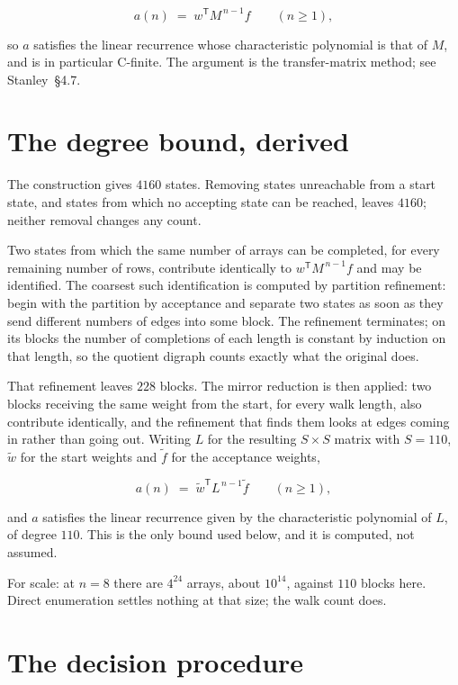 \documentclass[11pt]{article}
\theoremstyle{definition}
\begin{document}
\[a(n) \;=\; w^{\mathsf T} M^{\,n-1} f \qquad (n \ge 1),\]

so $a$ satisfies the linear recurrence whose characteristic polynomial is that of $M$, and is in particular C-finite. The argument is the transfer-matrix method; see Stanley~\S4.7.

\section{The degree bound, derived}

The construction gives $4160$ states. Removing states unreachable from a start state, and states from which no accepting state can be reached, leaves $4160$; neither removal changes any count.

Two states from which the same number of arrays can be completed, for every remaining number of rows, contribute identically to $w^{\mathsf T}M^{\,n-1}f$ and may be identified. The coarsest such identification is computed by partition refinement: begin with the partition by acceptance and separate two states as soon as they send different numbers of edges into some block. The refinement terminates; on its blocks the number of completions of each length is constant by induction on that length, so the quotient digraph counts exactly what the original does.

That refinement leaves $228$ blocks. The mirror reduction is then applied: two blocks receiving the same weight from the start, for every walk length, also contribute identically, and the refinement that finds them looks at edges coming in rather than going out. Writing $L$ for the resulting $S \times S$ matrix with $S = 110$, $\tilde w$ for the start weights and $\tilde f$ for the acceptance weights,

\[a(n) \;=\; \tilde w^{\mathsf T} L^{\,n-1} \tilde f \qquad (n \ge 1),\]

and $a$ satisfies the linear recurrence given by the characteristic polynomial of $L$, of degree $110$. This is the only bound used below, and it is computed, not assumed.

For scale: at $n = 8$ there are $4^{24}$ arrays, about $10^{14}$, against $110$ blocks here. Direct enumeration settles nothing at that size; the walk count does.

\section{The decision procedure}
\end{document}
